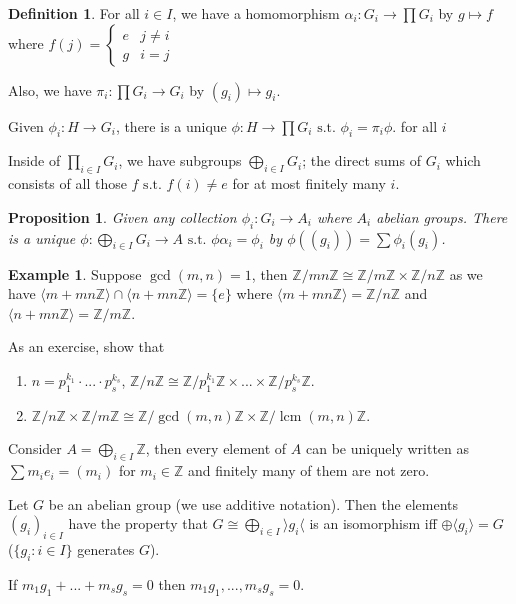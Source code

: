 \documentclass{amsart}
\newtheorem{prop}[thm]{Proposition}
\theoremstyle{definition}
\newtheorem{definition}[thm]{Definition}
\newtheorem{example}[thm]{Example}
\newcommand{\Z}{\mathbb Z}
\newcommand{\st}{\text{ s.t. }}
\DeclareMathOperator{\lcm}{lcm}
\begin{document}
\begin{definition}
For all $i\in I$, we have a homomorphism $\alpha_i:G_i\to \prod G_i$ by $g\mapsto f$ where $f(j)=\begin{cases}
	e&j\not=i\\g&i=j
\end{cases}$

Also, we have $\pi_i:\prod G_i\to G_i$ by $(g_i)\mapsto g_i$.

Given $\phi_i:H\to G_i$, there is a unique $\phi:H\to \prod G_i\st \phi_i=\pi_i\phi$. for all $i$	
\end{definition}
Inside of $\prod\limits_{i\in I}G_i$, we have subgroups $\bigoplus\limits_{i\in I}G_i$; the direct sums of $G_i$ which consists of all those $f\st f(i)\not=e$ for at most finitely many $i$.
\begin{prop}
Given any collection $\phi_i:G_i\to A_i$ where $A_i$ abelian groups. There is a unique $\phi:\bigoplus\limits_{i\in I} G_i\to A\st \phi\alpha_i=\phi_i$ by $\phi((g_i))=\sum\phi_i(g_i)$.	
\end{prop}
\begin{example}
Suppose $\gcd(m,n)=1$, then $\Z/mn\Z\cong\Z/m\Z\times\Z/n\Z$ as we have $\langle m+mn\Z\rangle\cap\langle n+mn\Z\rangle =\{e\}$ where $\langle m+mn\Z\rangle =\Z/n\Z$ and $\langle n+mn\Z\rangle =\Z/m\Z$.	
\end{example}
As an exercise, show that\begin{enumerate}
\item $n=p_1^{k_1}\cdot ...\cdot p_s^{k_s}$, $\Z/n\Z\cong \Z/p_1^{k_1}\Z\times ...\times \Z/p_s^{k_s}\Z$.
\item $\Z/n\Z\times \Z/m\Z\cong \Z/\gcd(m,n)\Z\times\Z/\lcm(m,n)\Z$.	
\end{enumerate}


Consider $A=\bigoplus\limits_{i\in I}\Z$, then every element of $A$ can be uniquely written as $\sum m_ie_i=(m_i)$ for $m_i\in\Z$ and finitely many of them are not zero.

Let $G$ be an abelian group (we use additive notation). Then the elements $(g_i)_{i\in I}$ have the property that $G\cong \bigoplus\limits_{i\in I}\rangle g_i\langle$ is an isomorphism iff $\oplus\langle g_i\rangle=G$ ($\{g_i:i\in I\}$ generates $G$).

If $m_1g_1+...+m_sg_s=0$ then $m_1g_1,...,m_sg_s=0$.
\end{document}
